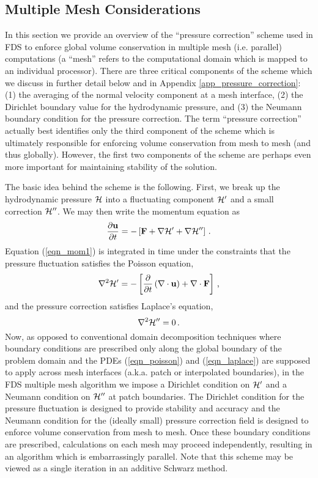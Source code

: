 \documentclass[11pt]{book}
\begin{document}
\subsection{Multiple Mesh Considerations}

In this section we provide an overview of the ``pressure correction'' scheme used in FDS to enforce global volume conservation in multiple mesh (i.e. parallel) computations (a ``mesh'' refers to the computational domain which is mapped to an individual processor).  There are three critical components of the scheme which we discuss in further detail below and in Appendix \ref{app_pressure_correction}: (1) the averaging of the normal velocity component at a mesh interface, (2) the Dirichlet boundary value for the hydrodynamic pressure, and (3) the Neumann boundary condition for the pressure correction.  The term ``pressure correction'' actually best identifies only the third component of the scheme which is ultimately responsible for enforcing volume conservation from mesh to mesh (and thus globally).  However, the first two components of the scheme are perhaps even more important for maintaining stability of the solution.

The basic idea behind the scheme is the following.  First, we break up the hydrodynamic pressure ${\cal H}$ into a fluctuating component ${\cal H}'$ and a small correction $\cal H''$.  We may then write the momentum equation as
\begin{equation}
\label{eqn_mom1}
\frac{\partial \mathbf{u}}{\partial t} = - \left[ \mathbf{F} + \nabla {\cal H}' + \nabla {\cal H}'' \right] \,\mbox{.}
\end{equation}
Equation (\ref{eqn_mom1}) is integrated in time under the constraints that the pressure fluctuation satisfies the Poisson equation,
\begin{equation}
\label{eqn_poisson}
\nabla^2 {\cal H}' = - \left[ \frac{\partial}{\partial t} \left(\nabla\cdot \mathbf{u}\right) + \nabla\cdot \mathbf{F} \right] \,\mbox{,}
\end{equation}
and the pressure correction satisfies Laplace's equation,
\begin{equation}
\label{eqn_laplace}
\nabla^2 {\cal H}'' = 0 \,\mbox{.}
\end{equation}
Now, as opposed to conventional domain decomposition techniques where boundary conditions are prescribed only along the global boundary of the problem domain and the PDEs (\ref{eqn_poisson}) and (\ref{eqn_laplace}) are supposed to apply across mesh interfaces (a.k.a. patch or interpolated boundaries), in the FDS multiple mesh algorithm we impose a Dirichlet condition on ${\cal H}^\prime$ and a Neumann condition on ${\cal H}^{\prime\prime}$ at patch boundaries.  The Dirichlet condition for the pressure fluctuation is designed to provide stability and accuracy and the Neumann condition for the (ideally small) pressure correction field is designed to enforce volume conservation from mesh to mesh.  Once these boundary conditions are prescribed, calculations on each mesh may proceed independently, resulting in an algorithm which is embarrassingly parallel.  Note that this scheme may be viewed as a single iteration in an additive Schwarz method.
\end{document}
